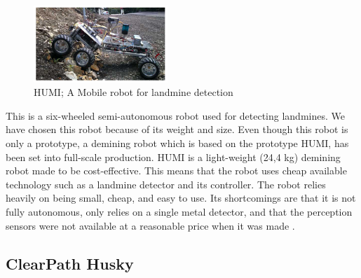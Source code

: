 \begin{figure}
    \centering
      \includegraphics[width=0.45\textwidth]{00 - Images/humi_a_mobile_robot_for_landmine_detection.png}
  \caption{HUMI; A Mobile robot for landmine detection \cite{HUMI2012}}
  \label{fig:humi_a_mobile_robot_for_landmine_detection}
\end{figure}
This is a six-wheeled semi-autonomous robot used for detecting landmines. We have chosen this robot because of its weight and size. Even though this robot is only a prototype, a demining robot which is based on the prototype HUMI, has been set into full-scale production. HUMI is a light-weight (24,4 kg) demining robot made to be cost-effective. This means that the robot uses cheap available technology such as a landmine detector and its controller. The robot relies heavily on being small, cheap, and easy to use. Its shortcomings are that it is not fully autonomous, only relies on a single metal detector, and that the perception sensors were not available at a reasonable price when it was made \cite{HUMI2012}.

\subsection{ClearPath Husky}

